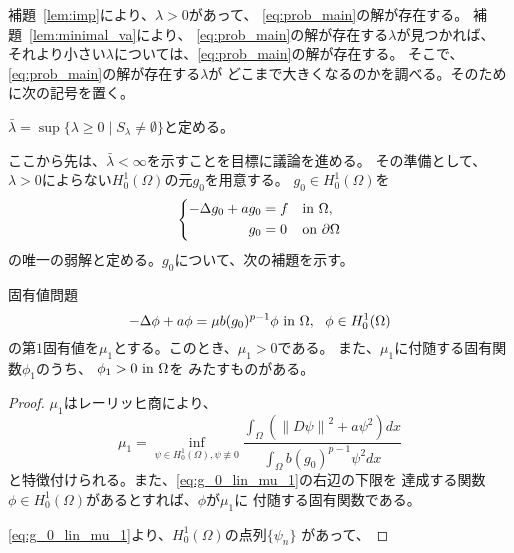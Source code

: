 補題~\ref{lem:imp}により、$\lambda > 0$があって、
\ref{eq:prob_main}の解が存在する。
補題~\ref{lem:minimal_va}により、
\ref{eq:prob_main}の解が存在する$\lambda$が見つかれば、
それより小さい$\lambda$については、\ref{eq:prob_main}の解が存在する。
そこで、\ref{eq:prob_main}の解が存在する$\lambda$が
どこまで大きくなるのかを調べる。そのために次の記号を置く。

\begin{nota}
 $\bar{\lambda} = \sup \{ \lambda \geq 0 \mid S_\lambda \neq \emptyset
 \}$と定める。
\end{nota}

ここから先は、$\bar{\lambda} < \infty$を示すことを目標に議論を進める。
その準備として、$\lambda > 0$によらない$H_0^1(\Omega)$の元$g_0$を用意する。
$g_0 \in H_0^1(\Omega)$を
\begin{align}
 \left\{
 \begin{aligned}
    -\Delta g_0 + a g_0 
  &= f  & &\text{in}~ \Omega,  \\
  g_0 &= 0 & &\text{on}~ \partial\Omega
 \end{aligned}
 \right. \label{eq:g_0}
\end{align}
の唯一の弱解と定める。$g_0$について、次の補題を示す。

\begin{lem}
 固有値問題
 \[
  -\Delta \phi + a \phi = \mu b (g_0)^{p-1}\phi ~\text{in}~ \Omega, \ \
 \phi \in H_0^1(\Omega)
 \]
 の第$1$固有値を$\mu_1$とする。このとき、$\mu_1 > 0$である。
 また、$\mu_1$に付随する固有関数$\phi_1$のうち、
 $\phi_1 > 0 ~\text{in}~ \Omega$を
 みたすものがある。
\end{lem}

\begin{proof}
 $\mu_1$はレーリッヒ商により、
 \begin{equation}
  \mu_1 = \inf_{\psi \in H_0^1(\Omega), \psi \not\equiv 0}
   \frac{\displaystyle \int_\Omega \left( \left\| D \psi \right\|^2 + a \psi^2
                     \right) dx}{\displaystyle \int_\Omega b (g_0)^{p-1} \psi^2 dx}
   \label{eq:g_0_lin_mu_1}
 \end{equation}
 と特徴付けられる。また、\eqref{eq:g_0_lin_mu_1}の右辺の下限を
 達成する関数$\phi \in H_0^1(\Omega)$があるとすれば、$\phi$が$\mu_1$に
 付随する固有関数である。

 \eqref{eq:g_0_lin_mu_1}より、$H_0^1(\Omega)$の点列$\{ \psi_n \}$
 があって、
 \qedhere
\end{proof}